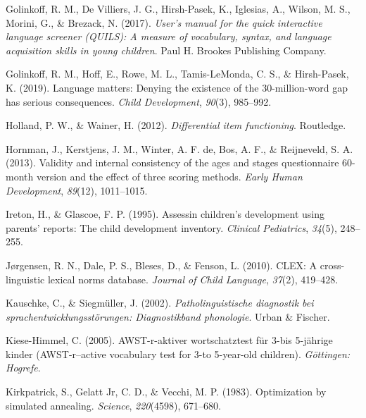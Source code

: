 \documentclass[
  man,floatsintext]{apa6}
\newlength{\cslhangindent}
\newlength{\cslentryspacingunit} %
\newenvironment{CSLReferences}[2] %
 {%
  \setlength{\parindent}{0pt}
  \ifodd #1
  \let\oldpar\par
  \def\par{\hangindent=\cslhangindent\oldpar}
  \fi
  \setlength{\parskip}{#2\cslentryspacingunit}
 }%
 {}
\begin{document}
\begin{CSLReferences}{1}{0}
\leavevmode{}%
Golinkoff, R. M., De Villiers, J. G., Hirsh-Pasek, K., Iglesias, A., Wilson, M. S., Morini, G., \& Brezack, N. (2017). \emph{User's manual for the quick interactive language screener (QUILS): A measure of vocabulary, syntax, and language acquisition skills in young children}. Paul H. Brookes Publishing Company.

\leavevmode{}%
Golinkoff, R. M., Hoff, E., Rowe, M. L., Tamis-LeMonda, C. S., \& Hirsh-Pasek, K. (2019). Language matters: Denying the existence of the 30-million-word gap has serious consequences. \emph{Child Development}, \emph{90}(3), 985--992.

\leavevmode{}%
Holland, P. W., \& Wainer, H. (2012). \emph{Differential item functioning}. Routledge.

\leavevmode{}%
Hornman, J., Kerstjens, J. M., Winter, A. F. de, Bos, A. F., \& Reijneveld, S. A. (2013). Validity and internal consistency of the ages and stages questionnaire 60-month version and the effect of three scoring methods. \emph{Early Human Development}, \emph{89}(12), 1011--1015.

\leavevmode{}%
Ireton, H., \& Glascoe, F. P. (1995). Assessin children's development using parents' reports: The child development inventory. \emph{Clinical Pediatrics}, \emph{34}(5), 248--255.

\leavevmode{}%
Jørgensen, R. N., Dale, P. S., Bleses, D., \& Fenson, L. (2010). CLEX: A cross-linguistic lexical norms database. \emph{Journal of Child Language}, \emph{37}(2), 419--428.

\leavevmode{}%
Kauschke, C., \& Siegmüller, J. (2002). \emph{Patholinguistische diagnostik bei sprachentwicklungsst{ö}rungen: Diagnostikband phonologie}. Urban \& Fischer.

\leavevmode{}%
Kiese-Himmel, C. (2005). AWST-r-aktiver wortschatztest f{ü}r 3-bis 5-j{ä}hrige kinder (AWST-r--active vocabulary test for 3-to 5-year-old children). \emph{G{ö}ttingen: Hogrefe}.

\leavevmode{}%
Kirkpatrick, S., Gelatt Jr, C. D., \& Vecchi, M. P. (1983). Optimization by simulated annealing. \emph{Science}, \emph{220}(4598), 671--680.


\end{CSLReferences}
\end{document}
